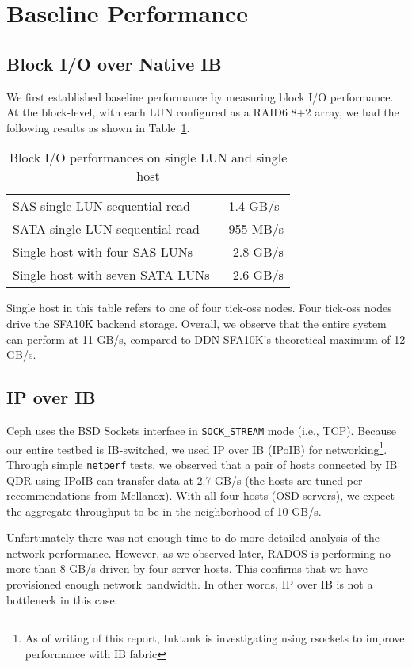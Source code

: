 \section{Baseline Performance}
\label{sec:block-io}

\subsection{Block I/O over Native IB} 

We first established baseline performance by measuring block I/O performance.
At the block-level, with each LUN configured as a RAID6 8+2 array, we had the
following results as shown in Table~\ref{tbl:block-io-baseline}.

\begin{table}[htb]
\centering
\caption{Block I/O performances on single LUN and single host}
\label{tbl:block-io-baseline}

\begin{tabular}{| l | l |}
    \hline
    SAS single LUN sequential read & ~1.4 GB/s \\
    SATA single LUN sequential read & ~955 MB/s \\
    Single host with four SAS LUNs & ~ 2.8 GB/s \\
    Single host with seven SATA LUNs & ~ 2.6 GB/s \\
    \hline
\end{tabular}
\end{table}

Single host in this table refers to one of four tick-oss nodes. Four tick-oss
nodes drive the SFA10K backend storage. Overall, we observe that the entire
system can perform at 11 GB/s, compared to DDN SFA10K's theoretical maximum of
12 GB/s.


\subsection{IP over IB}

Ceph uses the BSD Sockets interface in \texttt{SOCK\_STREAM} mode (i.e., TCP).
Because our entire testbed is IB-switched, we used IP over IB (IPoIB) for
networking\footnote{As of writing of this report, Inktank is investigating using
rsockets to improve performance with IB fabric}. Through simple
\verb!netperf! tests, we observed that a pair of hosts connected by IB QDR using
IPoIB can transfer data at 2.7 GB/s (the hosts are tuned per recommendations
from Mellanox). With all four hosts (OSD servers), we expect the aggregate
throughput to be in the neighborhood of 10 GB/s.

Unfortunately there was not enough time to do more detailed analysis of the
network performance. However, as we observed later, RADOS is performing no
more than 8 GB/s driven by four server hosts. This confirms that we have
provisioned enough network bandwidth. In other words, IP over IB is not a
bottleneck in this case.

